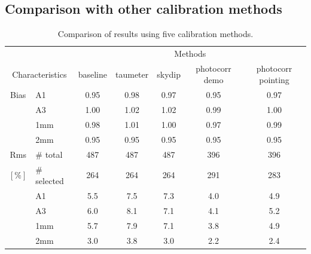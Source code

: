 \subsection{Comparison with other calibration methods}
\label{se:photometry_others}

\begin{table}[!htbp]
\begin{center}
\begin{tabular}{|c|l|c|c|c|c|c|}
  \hline
  \multicolumn{2}{|c|}{}  &  \multicolumn{5}{|c|}{Methods} \\\cline{3-7}
  \multicolumn{2}{|c|}{Characteristics} &  baseline  & taumeter  &  skydip  &  photocorr demo & photocorr pointing \\
  \hline\hline
  Bias &  A1            &   0.95   &  0.98    &  0.97    &   0.95    &  0.97  \\
       &  A3            &   1.00   &  1.02    &  1.02    &   0.99    &  1.00  \\
       &  1mm           &   0.98   &  1.01    &  1.00    &   0.97    &  0.99  \\
       &  2mm           &   0.95   &  0.95    &  0.95    &   0.95    &  0.95  \\
  \hline
  Rms  &  $\#$ total    &   487    &    487   &    487    &    396    &  396 \\
  $[\%]$ &  $\#$ selected &   264    &    264   &    264    &    291    &  283 \\
       &  A1            &   5.5    &    7.5   &    7.3    &    4.0    &  4.9 \\
       &  A3            &   6.0    &    8.1   &    7.1    &    4.1    &  5.2 \\
       &  1mm           &   5.7    &    7.9   &    7.1    &    3.8    &  4.9 \\
       &  2mm           &   3.0    &    3.8   &    3.0    &    2.2    &  2.4 \\
\hline\hline
\end{tabular}
\caption[Comparison of calibration results using five
  methods]{Comparison of results using five calibration methods.}
\label{tab:Calibration_results_all}
\end{center}
\end{table}

